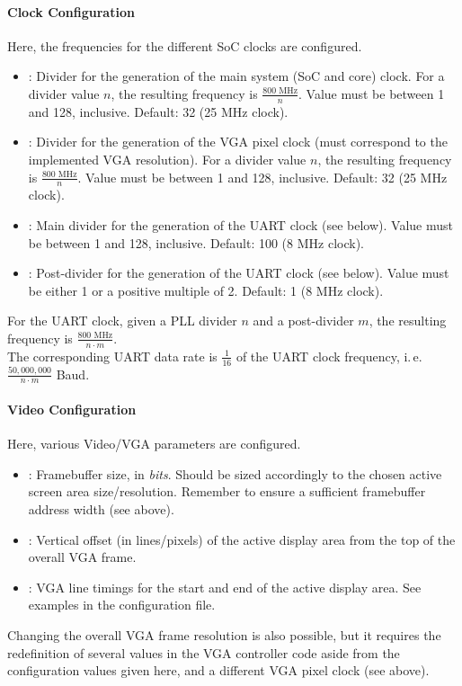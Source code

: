 \paragraph{Clock Configuration}
Here, the frequencies for the different SoC clocks are configured.
\begin{itemize}
    \item {}: Divider for the generation of the main system (SoC and core) clock. For a divider value $n$, the resulting frequency is $\frac{800 \text{ MHz}}{n}$. Value must be between 1 and 128, inclusive. Default: 32 (25 MHz clock).
    \item {}: Divider for the generation of the VGA pixel clock (must correspond to the implemented VGA resolution). For a divider value $n$, the resulting frequency is $\frac{800 \text{ MHz}}{n}$. Value must be between 1 and 128, inclusive. Default: 32 (25 MHz clock).
    \item {}: Main divider for the generation of the UART clock (see below). Value must be between 1 and 128, inclusive. Default: 100 (8 MHz clock).
    \item {}: Post-divider for the generation of the UART clock (see below). Value must be either 1 or a positive multiple of 2. Default: 1 (8 MHz clock).
\end{itemize}
For the UART clock, given a PLL divider $n$ and a post-divider $m$, the resulting frequency is $\frac{800 \text{ MHz}}{n \cdot m}$.\\
The corresponding UART data rate is $\frac{1}{16}$ of the UART clock frequency, i.\,e. $\frac{50,000,000}{n \cdot m}$ Baud.

\paragraph{Video Configuration}
Here, various Video/VGA parameters are configured.
\begin{itemize}
    \item {}: Framebuffer size, in \textit{bits}. Should be sized accordingly to the chosen active screen area size/resolution. Remember to ensure a sufficient framebuffer address width (see above).
    \item {}: Vertical offset (in lines/pixels) of the active display area from the top of the overall VGA frame.
    \item {}: VGA line timings for the start and end of the active display area. See examples in the configuration file.
\end{itemize}
Changing the overall VGA frame resolution is also possible, but it requires the redefinition of several values in the VGA controller code aside from the configuration values given here, and a different VGA pixel clock (see above).

